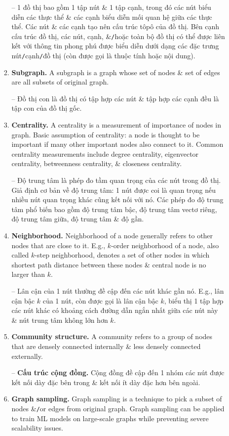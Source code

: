 \documentclass{article}
\begin{document}
\begin{itemize}
\begin{itemize}
\begin{enumerate}
            -- 1 đồ thị bao gồm 1 tập nút \& 1 tập cạnh, trong đó các nút biểu diễn các thực thể \& các cạnh biểu diễn mối quan hệ giữa các thực thể. Các nút \& các cạnh tạo nên cấu trúc tôpô của đồ thị. Bên cạnh cấu trúc đồ thị, các nút, cạnh, \&{\tt/}hoặc toàn bộ đồ thị có thể được liên kết với thông tin phong phú được biểu diễn dưới dạng các đặc trưng nút{\tt/}cạnh{\tt/}đồ thị (còn được gọi là thuộc tính hoặc nội dung).
            \item {\bf Subgraph.} A subgraph is a graph whose set of nodes \& set of edges are all subsets of original graph.

            -- Đồ thị con là đồ thị có tập hợp các nút \& tập hợp các cạnh đều là tập con của đồ thị gốc.
            \item {\bf Centrality.} A centrality is a measurement of importance of nodes in graph. Basic assumption of centrality: a node is thought to be important if many other important nodes also connect to it. Common centrality measurements include degree centrality, eigenvector centrality, betweenness centrality, \& closeness centrality.

            -- Độ trung tâm là phép đo tầm quan trọng của các nút trong đồ thị. Giả định cơ bản về độ trung tâm: 1 nút được coi là quan trọng nếu nhiều nút quan trọng khác cũng kết nối với nó. Các phép đo độ trung tâm phổ biến bao gồm độ trung tâm bậc, độ trung tâm vectơ riêng, độ trung tâm giữa, độ trung tâm \& độ gần.
            \item {\bf Neighborhood.} Neighborhood of a node generally refers to other nodes that are close to it. E.g., $k$-order neighborhood of a node, also called $k$-step neighborhood, denotes a set of other nodes in which shortest path distance between these nodes \& central node is no larger than $k$.

            -- Lân cận của 1 nút thường đề cập đến các nút khác gần nó. E.g., lân cận bậc $k$ của 1 nút, còn được gọi là lân cận bậc $k$, biểu thị 1 tập hợp các nút khác có khoảng cách đường dẫn ngắn nhất giữa các nút này \& nút trung tâm không lớn hơn $k$.
            \item {\bf Community structure.} A community refers to a group of nodes that are densely connected internally \& less densely connected externally.

            -- {\bf Cấu trúc cộng đồng.} Cộng đồng đề cập đến 1 nhóm các nút được kết nối dày đặc bên trong \& kết nối ít dày đặc hơn bên ngoài.
            \item {\bf Graph sampling.} Graph sampling is a technique to pick a subset of nodes \&{\tt/}or edges from original graph. Graph sampling can be applied to train ML models on large-scale graphs while preventing severe scalability issues.


\end{enumerate}
\end{itemize}
\end{itemize}
\end{document}
